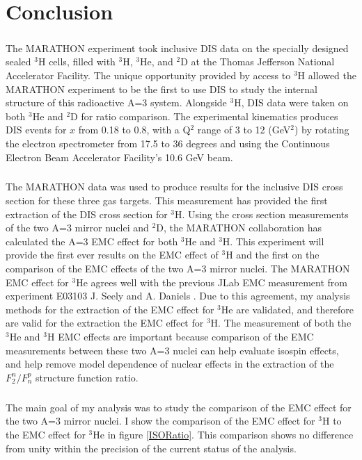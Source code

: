 
\chapter{Conclusion}
\paragraph{}The MARATHON experiment took inclusive DIS data on the specially designed sealed $^3$H cells, filled with $^3$H, $^3$He, and $^2$D at the Thomas Jefferson National Accelerator Facility. The unique opportunity provided by access to $^3$H allowed the MARATHON experiment to be the first to use DIS to study the internal structure of this radioactive A=3 system. Alongside $^3$H, DIS data were taken on both $^3$He and $^2$D for ratio comparison. The experimental kinematics produces DIS events for $x$ from 0.18 to 0.8, with a Q$^2$ range of 3 to 12 (GeV$^2$) by rotating the electron spectrometer from 17.5 to 36 degrees and using the Continuous Electron Beam Accelerator Facility's 10.6 GeV beam. 
\paragraph{}The MARATHON data was used to produce results for the inclusive DIS cross section for these three gas targets. This measurement has provided the first extraction of the DIS cross section for $^3$H. Using the cross section measurements of the two A=3 mirror nuclei and $^2$D, the MARATHON collaboration has calculated the A=3 EMC effect for both $^3$He and $^3$H. This experiment will provide the first ever results on the EMC effect of $^3$H and the first on the comparison of the EMC effects of the two A=3 mirror nuclei. The MARATHON EMC effect for $^3$He agrees well with the previous JLab EMC measurement from experiment E03103 J. Seely and A. Daniels \cite{seeley}. Due to this agreement, my analysis methods for the extraction of the EMC effect for $^3$He are validated, and therefore are valid for the extraction the EMC effect for $^3$H. The measurement of both the $^3$He and $^3$H EMC effects are important because comparison of the EMC measurements between these two A=3 nuclei can help evaluate isospin effects, and help remove model dependence of nuclear effects in the extraction of the $F^n_2/F^p_n$ structure function ratio. 

\paragraph{}The main goal of my analysis was to study the comparison of the EMC effect for the two A=3 mirror nuclei. I show the comparison of the EMC effect for $^3$H to the EMC effect for $^3$He in figure \ref{ISORatio}. This comparison shows no difference from unity within the precision of the current status of the analysis. 

